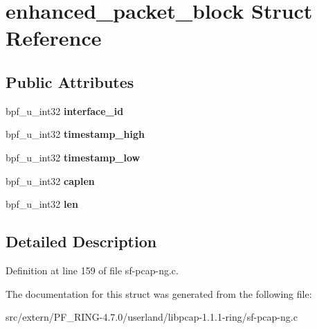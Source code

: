 \hypertarget{structenhanced__packet__block}{
\section{enhanced\_\-packet\_\-block Struct Reference}
\label{structenhanced__packet__block}
}
\subsection*{Public Attributes}
\begin{DoxyCompactItemize}
\item 
\hypertarget{structenhanced__packet__block_a5e4f14beb7366ba42e97597a37a0b75a}{
bpf\_\-u\_\-int32 {\bfseries interface\_\-id}}
\label{structenhanced__packet__block_a5e4f14beb7366ba42e97597a37a0b75a}

\item 
\hypertarget{structenhanced__packet__block_a1e22034185de59490e9762d7f949cc0c}{
bpf\_\-u\_\-int32 {\bfseries timestamp\_\-high}}
\label{structenhanced__packet__block_a1e22034185de59490e9762d7f949cc0c}

\item 
\hypertarget{structenhanced__packet__block_aba58c6a757c428c4a453c4defa07c826}{
bpf\_\-u\_\-int32 {\bfseries timestamp\_\-low}}
\label{structenhanced__packet__block_aba58c6a757c428c4a453c4defa07c826}

\item 
\hypertarget{structenhanced__packet__block_ab25b47be2d07da3aeafc9fd7c58e72ce}{
bpf\_\-u\_\-int32 {\bfseries caplen}}
\label{structenhanced__packet__block_ab25b47be2d07da3aeafc9fd7c58e72ce}

\item 
\hypertarget{structenhanced__packet__block_ab13644c8a31ea583b998ea5719151e5c}{
bpf\_\-u\_\-int32 {\bfseries len}}
\label{structenhanced__packet__block_ab13644c8a31ea583b998ea5719151e5c}

\end{DoxyCompactItemize}


\subsection{Detailed Description}


Definition at line 159 of file sf-\/pcap-\/ng.c.



The documentation for this struct was generated from the following file:\begin{DoxyCompactItemize}
\item 
src/extern/PF\_\-RING-\/4.7.0/userland/libpcap-\/1.1.1-\/ring/sf-\/pcap-\/ng.c\end{DoxyCompactItemize}
